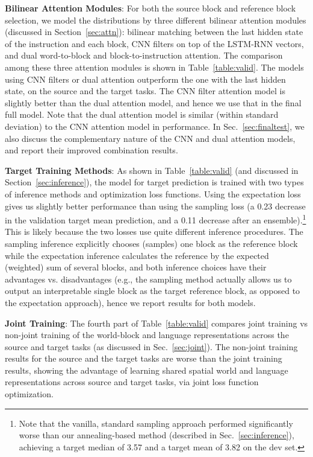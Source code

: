 \documentclass[letterpaper]{article} %
\begin{document}
\textbf{Bilinear Attention Modules}:
For both the source block and reference block selection, we model the distributions by three different bilinear attention modules (discussed in Section~\ref{sec:attn}): bilinear matching between the last hidden state of the instruction and each block, CNN filters on top of the LSTM-RNN vectors, and dual word-to-block and block-to-instruction attention. The comparison among these three attention modules is shown in Table~\ref{table:valid}.
The models using CNN filters or dual attention outperform the one with the last hidden state, on the source and the target tasks. The CNN filter attention model is slightly better than the dual attention model, and hence we use that in the final full model. Note that the dual attention model is similar (within standard deviation) to the CNN attention model in performance. In Sec.~\ref{sec:finaltest}, we also discuss the complementary nature of the CNN and dual attention models, and report their improved combination results.




\textbf{Target Training Methods}:
As shown in Table~\ref{table:valid} (and discussed in Section~\ref{sec:inference}), the model for target prediction is trained with two types of inference methods and optimization loss functions. Using the expectation loss gives us slightly better performance than using the sampling loss (a 0.23 decrease in the validation target mean prediction, and a 0.11 decrease after an ensemble).\footnote{Note that the vanilla, standard sampling approach performed significantly worse than our annealing-based method (described in Sec.~\ref{sec:inference}), achieving a target median of 3.57 and a target mean of 3.82 on the dev set.}
This is likely because the two losses use quite different inference procedures. The sampling inference explicitly chooses (samples) one block as the reference block while the expectation inference calculates the reference by the expected (weighted) sum of several blocks, and both inference choices have their advantages vs. disadvantages (e.g., the sampling method actually allows us to output an interpretable single block as the target reference block, as opposed to the expectation approach), hence we report results for both models. 


\textbf{Joint Training}:
The fourth part of Table~\ref{table:valid} compares  joint training vs non-joint training of the world-block and language representations across the source and target tasks (as discussed in Sec.~\ref{sec:joint}). The non-joint training results for the source and the target tasks are worse than the joint training results, showing the advantage of learning shared spatial world and language representations across source and target tasks, via joint loss function optimization. 
\end{document}
